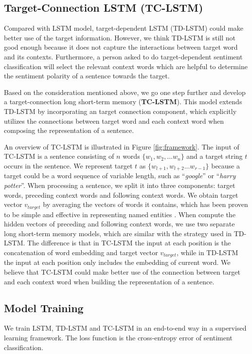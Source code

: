 \documentclass[11pt]{article}
\begin{document}
\subsection{Target-Connection LSTM (TC-LSTM)}
Compared with LSTM model, target-dependent LSTM (TD-LSTM) could make better use of the target information.
However, we think TD-LSTM is still not good enough because it does not capture the interactions between target word and its contexts.
Furthermore, a person asked to do target-dependent sentiment classification will select the relevant context words which are helpful to determine the sentiment polarity of a sentence towards the target. 

Based on the consideration mentioned above, we go one step further and develop a target-connection long short-term memory (\textbf{TC-LSTM}). 
This model extends TD-LSTM by incorporating an target connection component, which explicitly utilizes the connections between target word and each context word when composing the representation of a sentence.

An overview of TC-LSTM is illustrated in Figure \ref{fig:framework}. 
The input of TC-LSTM is a sentence consisting of $n$ words $\{w_1, w_2, ... w_n\}$ and a target string $t$ occurs in the sentence. We represent target $t$ as $\{w_{l+1}, w_{l+2} ...w_{r-1}\}$ because a target could be a word sequence of variable length, such as ``\textit{google}'' or ``\textit{harry potter}''. 
When processing a sentence, we split it into three components: target words, preceding context words and following context words.
We obtain target vector $v_{target}$ by averaging the vectors of words it contains, which has been proven to be simple and effective in representing named entities \cite{Socher2013b,Sun2015}. 
When compute the hidden vectors of preceding and following context words, we use two separate long short-term memory models, which are similar with the strategy used in TD-LSTM.
The difference is that in TC-LSTM the input at each position is the concatenation of word embedding and target vector $v_{target}$, while in TD-LSTM the input at each position only includes the embedding of current word. 
We believe that TC-LSTM could make better use of the connection between target and each context word when building the representation of a sentence. 

\subsection{Model Training}
We train LSTM, TD-LSTM and TC-LSTM in an end-to-end way in a supervised learning framework. 
The loss function is the cross-entropy error of sentiment classification.
\end{document}
